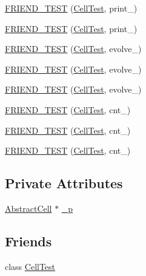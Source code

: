 \begin{DoxyCompactItemize}
\item 
\hyperlink{classCell_a5bc3951f0c503da404ee6c6863e819fb}{F\-R\-I\-E\-N\-D\-\_\-\-T\-E\-S\-T} (\hyperlink{classCell_a4a8fb13b6ff304aefc7aa29538062941}{Cell\-Test}, print\-\_)
\item 
\hyperlink{classCell_a70a0ef17fcc23ffbb87deab727075268}{F\-R\-I\-E\-N\-D\-\_\-\-T\-E\-S\-T} (\hyperlink{classCell_a4a8fb13b6ff304aefc7aa29538062941}{Cell\-Test}, print\-\_)
\item 
\hyperlink{classCell_a824557ceb650e5c124567a64bc5c6e4f}{F\-R\-I\-E\-N\-D\-\_\-\-T\-E\-S\-T} (\hyperlink{classCell_a4a8fb13b6ff304aefc7aa29538062941}{Cell\-Test}, evolve\-\_)
\item 
\hyperlink{classCell_a2ac0a81f96898596cdd2711ee5880ff4}{F\-R\-I\-E\-N\-D\-\_\-\-T\-E\-S\-T} (\hyperlink{classCell_a4a8fb13b6ff304aefc7aa29538062941}{Cell\-Test}, evolve\-\_)
\item 
\hyperlink{classCell_af0edc16195146ce5755e13df3c2db294}{F\-R\-I\-E\-N\-D\-\_\-\-T\-E\-S\-T} (\hyperlink{classCell_a4a8fb13b6ff304aefc7aa29538062941}{Cell\-Test}, evolve\-\_)
\item 
\hyperlink{classCell_a7e7750ebadd0abf2b2b51e42262c0c97}{F\-R\-I\-E\-N\-D\-\_\-\-T\-E\-S\-T} (\hyperlink{classCell_a4a8fb13b6ff304aefc7aa29538062941}{Cell\-Test}, cnt\-\_)
\item 
\hyperlink{classCell_a584061321fadade7c6a41400bde406ff}{F\-R\-I\-E\-N\-D\-\_\-\-T\-E\-S\-T} (\hyperlink{classCell_a4a8fb13b6ff304aefc7aa29538062941}{Cell\-Test}, cnt\-\_)
\item 
\hyperlink{classCell_aaf4702292ab380ee439ff51e4b1d46e8}{F\-R\-I\-E\-N\-D\-\_\-\-T\-E\-S\-T} (\hyperlink{classCell_a4a8fb13b6ff304aefc7aa29538062941}{Cell\-Test}, cnt\-\_)
\end{DoxyCompactItemize}
\subsection*{Private Attributes}
\begin{DoxyCompactItemize}
\item 
\hyperlink{classAbstractCell}{Abstract\-Cell} $\ast$ \hyperlink{classCell_af8bb6306c15463d257e4775095b2f273}{\-\_\-p}
\end{DoxyCompactItemize}
\subsection*{Friends}
\begin{DoxyCompactItemize}
\item 
class \hyperlink{classCell_a4a8fb13b6ff304aefc7aa29538062941}{Cell\-Test}
\end{DoxyCompactItemize}


